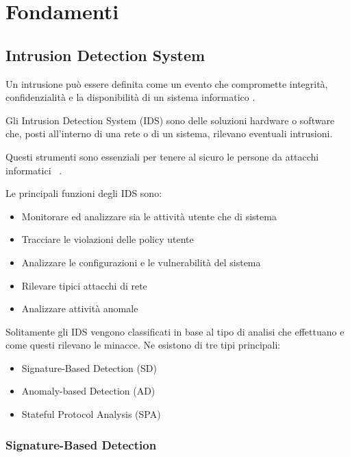 \chapter{Fondamenti}

\section{Intrusion Detection System}


Un intrusione può essere definita come un evento che compromette integrità, confidenzialità e la disponibilità di un sistema informatico \cite{biermannComparisonIntrusionDetection2001}.

Gli Intrusion Detection System (IDS) sono delle soluzioni hardware o software che, posti all'interno di una rete o di un sistema, rilevano eventuali intrusioni. 

Questi strumenti sono essenziali per tenere al sicuro le persone da attacchi informatici ~\cite{SurveyIntrusionDetection2019}.

\cite{ashoorImportanceIntrusionDetection2010} Le principali funzioni degli IDS sono: 

\begin{itemize}
    \item Monitorare ed analizzare sia le attività utente che di sistema
    \item Tracciare le violazioni delle policy utente
    \item Analizzare le configurazioni e le vulnerabilità del sistema
    \item Rilevare tipici attacchi di rete
    \item Analizzare attività anomale
\end{itemize}


\cite{liaoIntrusionDetectionSystem2013} Solitamente gli IDS vengono classificati in base al tipo di analisi che effettuano e come questi rilevano le minacce. Ne esistono di tre tipi principali:


\begin{itemize}
    \item Signature-Based Detection (SD)
    \item Anomaly-based Detection (AD)
    \item Stateful Protocol Analysis (SPA)
\end{itemize}



\subsection{Signature-Based Detection}

